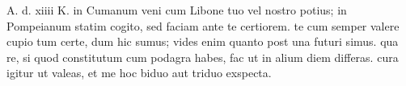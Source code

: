 


 A. d. xiiii K. in Cumanum veni cum Libone tuo vel nostro potius; in Pompeianum statim cogito, sed faciam ante te certiorem. te cum semper valere cupio tum certe, dum hic sumus; vides enim quanto post una futuri simus. qua re, si quod constitutum cum podagra habes, fac ut in alium diem differas. cura igitur ut valeas, et me hoc biduo aut triduo exspecta.
